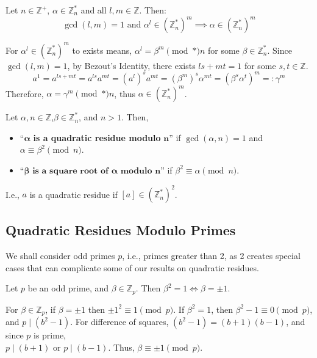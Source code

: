 \newpage 

\begin{theo}
    
    Let $n\in\mathbb{Z^+}$, $\alpha\in\mathbb{Z}_n^*$ and all $l,m\in\mathbb{Z}$. Then:
    \Large\[\gcd(l,m)=1 \text{ and } \alpha^l\in(\mathbb{Z}_n^*)^m \implies \alpha\in(\mathbb{Z}_n^*)^m\]
    \normalsize    
\end{theo}


\begin{Proof}
    For $\alpha^l\in(\mathbb{Z}_n^*)^m$ to exists means, $\alpha^l = \beta^m\pmod*{n}$ for some $\beta\in\mathbb{Z}_n^*$.
    Since $\gcd(l,m)=1$, by Bezout's Identity, there exists $ls+mt=1$ for some $s,t\in\mathbb{Z}$.
    \[
    a^1 = a^{ls+mt} = a^{ls}a^{mt} = \left(a^l \right)^s a^{mt} = \left(\beta^{m}\right)^s\alpha^{mt} = \left(\beta^s\alpha^t\right)^m =: \gamma^m
    \]
\noindent
    Therefore, $\alpha=\gamma^m \pmod*{n}$, thus $\alpha\in(\mathbb{Z}_n^*)^m$.
\end{Proof}

\noindent

\begin{Def}

    Let $\alpha,n\in\mathbb{Z}$,$\beta\in\mathbb{Z}_n^*$, and $n>1$. Then,
    \begin{itemize}
        \item ``$\mathbf{\alpha}$ \textbf{is a quadratic residue modulo }$\textbf{n}$'' if $\gcd(\alpha,n)=1$ and $\alpha\equiv \beta^2\pmod{n}$.
        \item ``$\mathbf{\beta} \textbf{ is a square root of } \mathbf{\alpha} \textbf{ modulo } \mathbf{n}$'' if $\beta^2\equiv \alpha\pmod{n}$.
    \end{itemize}
    I.e., $a$ is a quadratic residue if $[a]\in(\mathbb{Z}_n^*)^2$.
\end{Def}

\subsection{Quadratic Residues Modulo Primes}
We shall consider odd primes $p$, i.e., primes greater than 2, as 2 creates special cases that can complicate some of our results on quadratic residues.

\begin{theo}

    \label{theo:square_roots_1}

    Let $p$ be an odd prime, and $\beta\in\mathbb{Z}_p$. Then $\beta^2=1\Longleftrightarrow \beta=\pm1$.
\end{theo}
\begin{Proof}
    For $\beta\in\mathbb{Z}_p$, if $\beta=\pm1$ then $\pm1^2\equiv 1\pmod{p}$. If $\beta^2=1$, then $\beta^2-1\equiv 0\pmod{p}$,
    and $p\mid(b^2-1)$. For difference of squares, $(b^2-1)=(b+1)(b-1)$, and since $p$ is prime,\\
    $p\mid(b+1)$ or $p\mid(b-1)$. Thus, $\beta\equiv \pm1\pmod{p}$.
\end{Proof}

